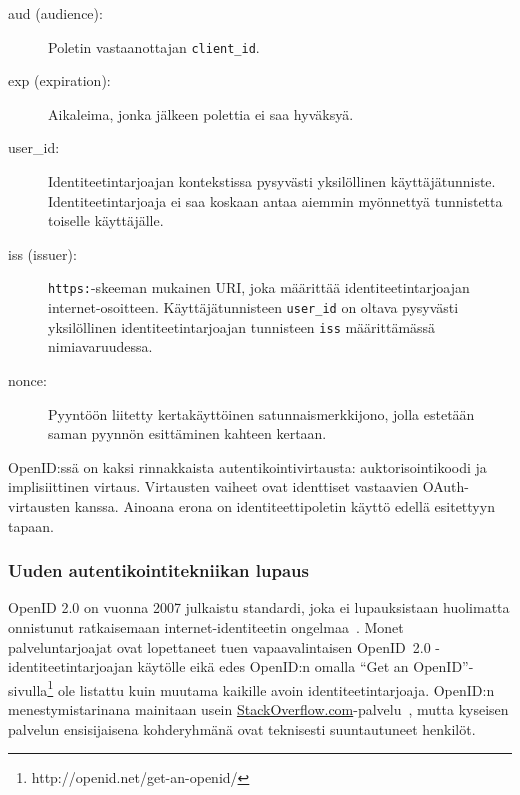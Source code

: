 \documentclass[finnish,gradu]{tktltiki}
\begin{document}
  \begin{description}
    \item[aud (audience):] Poletin vastaanottajan \verb!client_id!.

    \item[exp (expiration):] Aikaleima, jonka jälkeen polettia ei saa hyväksyä.

    \item[user\_id:] Identiteetintarjoajan kontekstissa pysyvästi yksilöllinen käyttäjätunniste. Identiteetintarjoaja ei saa koskaan antaa aiemmin myönnettyä tunnistetta toiselle käyttäjälle.

    \item[iss (issuer):] \verb!https:!-skeeman mukainen URI, joka määrittää identiteetintarjoajan internet-osoitteen. Käyttäjätunnisteen \verb!user_id! on oltava pysyvästi yksilöllinen identiteetintarjoajan tunnisteen \verb!iss! määrittämässä nimiavaruudessa.

    \item[nonce:] Pyyntöön liitetty kertakäyttöinen satunnaismerkkijono, jolla estetään saman pyynnön esittäminen kahteen kertaan.
  \end{description}

  OpenID:ssä on kaksi rinnakkaista autentikointivirtausta: auktorisointikoodi ja implisiittinen virtaus. Virtausten vaiheet ovat identtiset vastaavien OAuth-virtausten kanssa. Ainoana erona on identiteettipoletin käyttö edellä esitettyyn tapaan.


  \subsubsection{Uuden autentikointitekniikan lupaus} %
  \label{ssub:uuden_autentikointitekniikan_lupaus}

  OpenID 2.0 on vuonna 2007 julkaistu standardi, joka ei lupauksistaan huolimatta onnistunut ratkaisemaan internet-identiteetin ongelmaa~\cite{openid_failure_gilbertson_2011, openid_failure_obasanjo_2011, openid_failure_edge_2011, openid_failure_conery_2010, openid_failure_quora_2010, openid_failure_37signals_2011}. Monet palveluntarjoajat ovat lopettaneet tuen vapaavalintaisen \mbox{OpenID 2.0} -identi\-teetin\-tarjoajan käytölle eikä edes OpenID:n omalla ``Get an OpenID''-si\-vul\-la\footnote{http://openid.net/get-an-openid/} ole listattu kuin muutama kaikille avoin identiteetintarjoaja. \mbox{OpenID}:n menestymistarinana mainitaan usein \url{StackOverflow.com}-palvelu~\cite{openid_success_stackoverflow_2010, openid_failure_conery_2010}, mutta kyseisen palvelun ensisijaisena kohderyhmänä ovat teknisesti suuntautuneet henkilöt.
\end{document}
